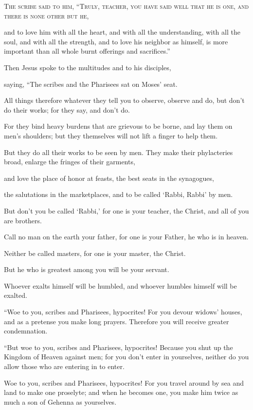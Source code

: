 \lettrine{T}{he scribe said to him, “Truly, teacher, you have said well that he is one, and there is none other but he,}

and to love him with all the heart, and with all the understanding, with all the soul, and with all the strength, and to love his neighbor as himself, is more important than all whole burnt offerings and sacrifices.”

Then Jesus spoke to the multitudes and to his disciples,

saying, “The scribes and the Pharisees sat on Moses’ seat.

All things therefore whatever they tell you to observe, observe and do, but don’t do their works; for they say, and don’t do.

For they bind heavy burdens that are grievous to be borne, and lay them on men’s shoulders; but they themselves will not lift a finger to help them.

But they do all their works to be seen by men. They make their phylacteries  broad, enlarge the fringes of their garments,

and love the place of honor at feasts, the best seats in the synagogues,

the salutations in the marketplaces, and to be called ‘Rabbi, Rabbi’ by men.

But don’t you be called ‘Rabbi,’ for one is your teacher, the Christ, and all of you are brothers.

Call no man on the earth your father, for one is your Father, he who is in heaven.

Neither be called masters, for one is your master, the Christ.

But he who is greatest among you will be your servant.

Whoever exalts himself will be humbled, and whoever humbles himself will be exalted.

“Woe to you, scribes and Pharisees, hypocrites! For you devour widows’ houses, and as a pretense you make long prayers. Therefore you will receive greater condemnation.

“But woe to you, scribes and Pharisees, hypocrites! Because you shut up the Kingdom of Heaven against men; for you don’t enter in yourselves, neither do you allow those who are entering in to enter.

Woe to you, scribes and Pharisees, hypocrites! For you travel around by sea and land to make one proselyte; and when he becomes one, you make him twice as much a son of Gehenna as yourselves.

